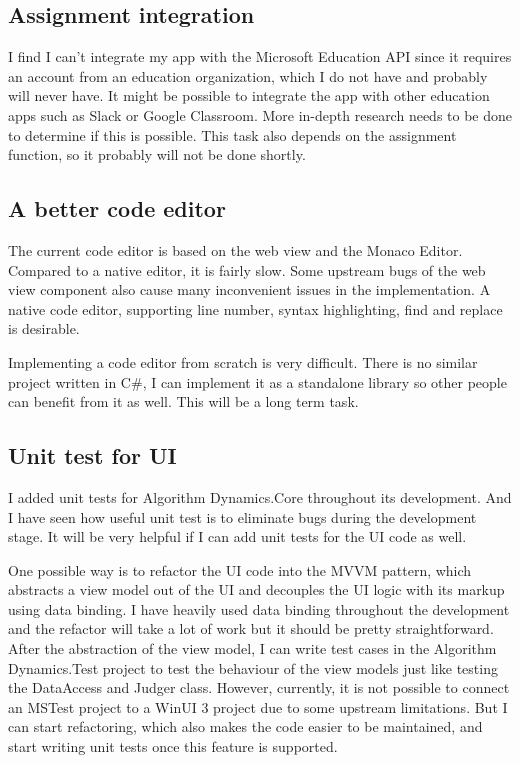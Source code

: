 \documentclass[report.tex]{subfiles}
\begin{document}
\subsection{Assignment integration}

I find I can't integrate my app with the Microsoft Education API since it requires an account from an education organization, which I do not have and probably will never have. It might be possible to integrate the app with other education apps such as Slack or Google Classroom. More in-depth research needs to be done to determine if this is possible. This task also depends on the assignment function, so it probably will not be done shortly.

\subsection{A better code editor}

The current code editor is based on the web view and the Monaco Editor. Compared to a native editor, it is fairly slow. Some upstream bugs of the web view component also cause many inconvenient issues in the implementation. A native code editor, supporting line number, syntax highlighting, find and replace is desirable.

Implementing a code editor from scratch is very difficult. There is no similar project written in C\#, I can implement it as a standalone library so other people can benefit from it as well. This will be a long term task.

\subsection{Unit test for UI}

I added unit tests for Algorithm Dynamics.Core throughout its development. And I have seen how useful unit test is to eliminate bugs during the development stage. It will be very helpful if I can add unit tests for the UI code as well.

One possible way is to refactor the UI code into the MVVM\cite{microsoft:docs:mvvm-introduction} pattern, which abstracts a view model out of the UI and decouples the UI logic with its markup using data binding\cite{microsoft:docs:data-binding-and-mvvm}. I have heavily used data binding throughout the development and the refactor will take a lot of work but it should be pretty straightforward. After the abstraction of the view model, I can write test cases in the Algorithm Dynamics.Test project to test the behaviour of the view models just like testing the DataAccess and Judger class. However, currently, it is not possible to connect an MSTest project to a WinUI 3 project due to some upstream limitations\cite{github:microsoft-ui-xaml:6258}. But I can start refactoring, which also makes the code easier to be maintained, and start writing unit tests once this feature is supported.
\end{document}
